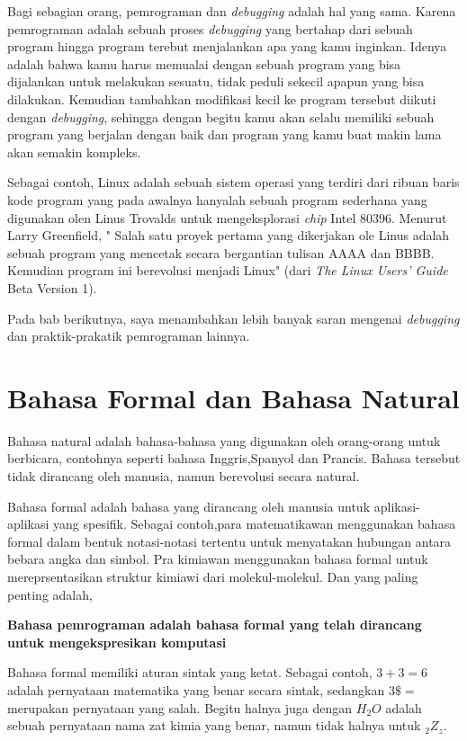 Bagi sebagian orang, pemrograman dan \textit{debugging} adalah hal yang sama. Karena pemrograman adalah sebuah proses \textit{debugging} yang bertahap dari sebuah program hingga program terebut menjalankan apa yang kamu inginkan. Idenya adalah bahwa kamu harus memualai dengan sebuah program yang bisa dijalankan untuk melakukan sesuatu, tidak peduli sekecil apapun yang bisa dilakukan. Kemudian tambahkan modifikasi kecil ke program tersebut diikuti dengan \textit{debugging}, sehingga dengan begitu kamu akan selalu memiliki sebuah program yang berjalan dengan baik dan program yang kamu buat makin lama akan semakin kompleks.

Sebagai contoh, Linux adalah sebuah sistem operasi yang terdiri dari ribuan baris kode program yang pada awalnya hanyalah sebuah program sederhana yang digunakan olen Linus Trovalds untuk mengeksplorasi \textit{chip} Intel 80396. Menurut Larry Greenfield, " Salah satu proyek pertama yang dikerjakan ole Linus adalah sebuah program yang mencetak secara bergantian tulisan AAAA dan BBBB. Kemudian program ini berevolusi menjadi Linux" (dari \textit{The Linux Users' Guide} Beta Version 1).

Pada bab berikutnya, saya menambahkan lebih banyak saran mengenai \textit{debugging} dan praktik-prakatik pemrograman lainnya.


\section{Bahasa Formal dan Bahasa Natural}

Bahasa natural adalah bahasa-bahasa yang digunakan oleh orang-orang untuk berbicara, contohnya seperti bahasa Inggris,Spanyol dan Prancis. Bahasa tersebut tidak dirancang oleh manusia, namun berevolusi secara natural.

Bahasa formal adalah bahasa yang dirancang oleh manusia untuk aplikasi-aplikasi yang spesifik. Sebagai contoh,para matematikawan menggunakan bahasa formal dalam bentuk notasi-notasi tertentu untuk menyatakan hubungan antara bebara angka dan simbol. Pra kimiawan menggunakan bahasa formal untuk mereprsentasikan struktur kimiawi dari molekul-molekul. Dan yang paling penting adalah, 

\textbf{Bahasa pemrograman adalah bahasa formal yang telah dirancang untuk mengekspresikan komputasi}

Bahasa formal memiliki aturan sintak yang ketat. Sebagai contoh, $3+3=6$ adalah pernyataan matematika yang benar secara sintak, sedangkan $ 3\$=$ merupakan pernyataan yang salah. Begitu halnya juga dengan $H_{2}O$ adalah sebuah pernyataan nama zat kimia yang benar, namun tidak halnya untuk $_{2}Z_{z}$.

